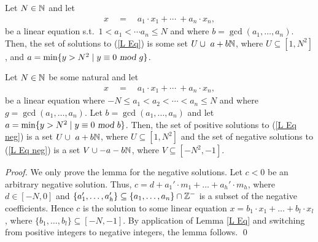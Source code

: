 \documentclass[times,envcountsame]{llncs}
\begin{document}
\begin{lemma}\label{L NT}
Let $N\in\mathbb{N}$ and let
\begin{eqnarray}
x\quad=\quad a_1\cdot x_1 + \cdots\ + a_n\cdot x_n,\label{L Eq}
\end{eqnarray}
be a linear equation s.t.\ $1<a_1<\cdots a_n\leq N$ and where
$b=\gcd(a_1,\ldots,a_n)$.
Then, the set of solutions to (\ref{L Eq}) is some set
$U\cup\ a+b\mathbb{N}$,
where $U\subseteq[1,N^2]$,
and
$a=\min\{y>N^2\mid y\equiv 0\textsl{ mod }g\}$.
\end{lemma}


\begin{lemma}
Let $N\in\mathbb{N}$ be some natural and let
\begin{eqnarray}
x\quad=\quad a_1\cdot x_1 + \cdots\ + a_n\cdot x_n,\label{L Eq neg}
\end{eqnarray}
be a linear equation
where $-N\leq a_1<a_2<\cdots <a_n\leq N$ and where $g=\gcd(a_1,\ldots,a_n)$.
Let $b=\gcd(a_1,\ldots,a_n)$ and let
$a=\min\{y>N^2\mid y\equiv 0\textsl{ mod }b\}$.
Then, the set of positive solutions to (\ref{L Eq neg}) is a set
$U\cup\  a+ b\mathbb{N}$, where $U\subseteq[1,N^2]$ and the
set of negative solutions to (\ref{L Eq neg}) is a set
$V\cup -a-b\mathbb{N}$, where $V\subseteq[-N^2,-1]$.
\end{lemma}
\begin{proof}
We only prove the lemma for the negative solutions.
Let $c<0$ be an arbitrary negative solution. Thus,
$c=d+a_1'\cdot m_1+\ldots +a_h'\cdot m_h$, where
$d\in[-N,0]$ and
$\{a_1',\ldots,a_h'\}\subseteq\{a_1,\ldots,a_n\}\cap\mathbb{Z}^-$ is a subset of
the negative coefficients.
Hence $c$ is the solution
to some linear equation $x=b_1\cdot x_1+\ldots +b_l\cdot x_l$, where
$\{b_1,\ldots,b_l\}\subseteq[-N,-1]$. By application of Lemma
\ref{L Eq} and switching from positive integers to negative integers, the lemma
follows.
\qed
\end{proof}
\end{document}
